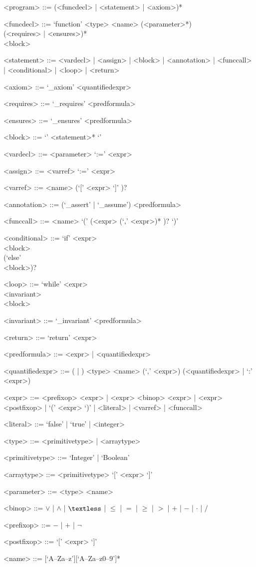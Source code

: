 \setlength{\grammarindent}{12em} %

\begin{grammar}

<program> ::= (<funcdecl> | <statement> | <axiom>)* 

<funcdecl> ::= `function' <type> <name> (<parameter>*) \\ (<requires> | <ensures>)* \\ <block>

<statement> ::= <vardecl> | <assign> | <block> | <annotation> | <funccall> | <conditional> | <loop> | <return>

<axiom> ::= `_axiom' <quantifiedexpr>

<requires> ::= `_requires' <predformula>

<ensures> ::= `_ensures' <predformula>

<block> ::= `{' <statement>* `}'

<vardecl> ::= <parameter> `:=' <expr>

<assign> ::= <varref> `:=' <expr>

<varref> ::= <name> (`[' <expr> `]' )?

<annotation> ::= (`_assert' | `_assume') <predformula>

<funccall> ::= <name> `(' (<expr> (`,' <expr>)* )? `)'

<conditional> ::= `if' <expr> \\ <block>  \\ (`else' \\ <block>)?

<loop> ::= `while' <expr> \\ <invariant> \\ <block>

<invariant> ::= `_invariant' <predformula>

<return> ::= `return' <expr>

<predformula> ::= <expr> | <quantifiedexpr>

<quantifiedexpr> ::= (\lit{$\forall$} | \lit{$\exists$} ) <type> <name> (`,' <expr>) (<quantifiedexpr> | `:' <expr>)

<expr> ::= <prefixop> <expr> | <expr> <binop> <expr> | <expr> <postfixop> | `(' <expr> `)' | <literal> | <varref> | <funccall>

<literal> ::= `false' | `true' | <integer>

<type> ::= <primitivetype> | <arraytype>

<primitivetype> ::= `Integer' | `Boolean'

<arraytype> ::= <primitivetype> `[' <expr> `]'

<parameter> ::= <type> <name>

<binop> ::= $\vee$ | $\wedge$ | $\textless$ | $\leq$ | $=$ | $\geq$ | $>$ | $+$ | $-$ | $\cdot$ | $/$

<prefixop> ::= $-$ | $+$ | $\neg$

<postfixop> ::= `[' <expr> `]'

<name> ::=  [`A--Za--z'][`A--Za--z0--9']*

\end{grammar}


